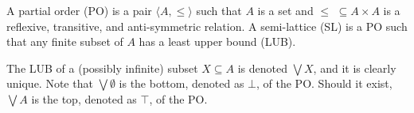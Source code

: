 \documentclass{llncs}
\newcommand{\comment}[1]{}
\def\monid{{\mathbf 0}}
\def\monid{\mathbf{1}}
\begin{document}
\begin{definition}[Orders]
	A partial order (PO) is a pair $\langle A, \leq \rangle$ such that
	$A$ is a set %
	and $\leq \,\,\subseteq A \times A$ is a reflexive, transitive, and
	anti-symmetric  relation.
	A semi-lattice (SL) is a PO
	such that any finite subset of $A$ has a least upper bound (LUB).
\end{definition}

The LUB of a (possibly infinite) subset $X \subseteq A$ is denoted $\bigvee X$, and it is clearly unique.
Note that $\bigvee \emptyset$ is the bottom, denoted as $\bot$, of the PO.
Should it exist, $\bigvee A$ is the top, denoted as $\top$, of the PO.

\comment{\begin{definition}[Compact elements]
An element $a \in A$ is compact 
if whenever $a \leq \bigvee Y$ for some $Y \subseteq A$
there exists a finite subset
$X \subseteq Y$ such that $a \leq \bigvee X$.
%
\end{definition}

We let $A^C \subseteq A$ denote the set of compact elements of ${\mathbb C}$. }

%



%
%
\end{document}
